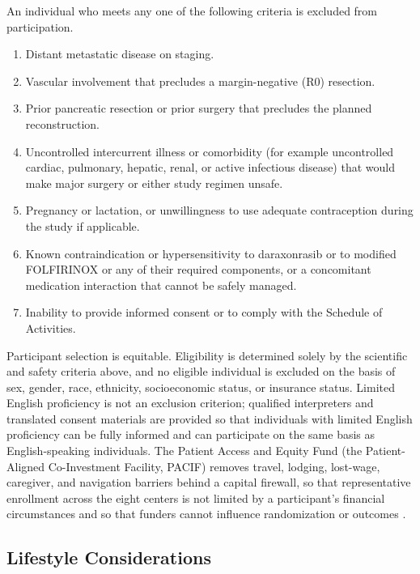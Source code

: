 An individual who meets any one of the following criteria is excluded from
participation.

\begin{enumerate}[leftmargin=1.6em,itemsep=2pt,topsep=2pt]
\item Distant metastatic disease on staging.
\item Vascular involvement that precludes a margin-negative (R0) resection.
\item Prior pancreatic resection or prior surgery that precludes the planned
reconstruction.
\item Uncontrolled intercurrent illness or comorbidity (for example uncontrolled
cardiac, pulmonary, hepatic, renal, or active infectious disease) that would make
major surgery or either study regimen unsafe.
\item Pregnancy or lactation, or unwillingness to use adequate contraception
during the study if applicable.
\item Known contraindication or hypersensitivity to daraxonrasib or to modified
FOLFIRINOX or any of their required components, or a concomitant medication
interaction that cannot be safely managed.
\item Inability to provide informed consent or to comply with the Schedule of
Activities.
\end{enumerate}

Participant selection is equitable. Eligibility is determined solely by the
scientific and safety criteria above, and no eligible individual is excluded on the
basis of sex, gender, race, ethnicity, socioeconomic status, or insurance status.
Limited English proficiency is not an exclusion criterion; qualified interpreters
and translated consent materials are provided so that individuals with limited
English proficiency can be fully informed and can participate on the same basis as
English-speaking individuals. The Patient Access and Equity Fund (the
Patient-Aligned Co-Investment Facility, PACIF) removes travel, lodging, lost-wage,
caregiver, and navigation barriers behind a capital firewall, so that
representative enrollment across the eight centers is not limited by a
participant's financial circumstances and so that funders cannot influence
randomization or outcomes \cite{kawchak2026hr9510,ecfr2026part54}.

\subsection{Lifestyle Considerations}

